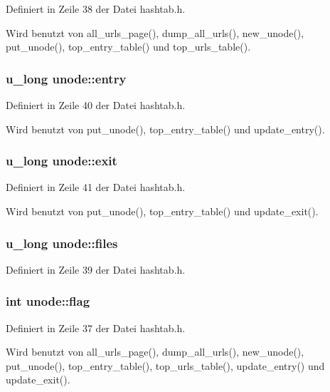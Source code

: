 Definiert in Zeile 38 der Datei hashtab.h.

Wird benutzt von all\_\-urls\_\-page(), dump\_\-all\_\-urls(), new\_\-unode(), put\_\-unode(), top\_\-entry\_\-table() und top\_\-urls\_\-table().
\subsubsection{\setlength{\rightskip}{0pt plus 5cm}u\_\-long {\bf unode::entry}}\label{structunode_8799c3c150906874e134a2cc3ccce10d}




Definiert in Zeile 40 der Datei hashtab.h.

Wird benutzt von put\_\-unode(), top\_\-entry\_\-table() und update\_\-entry().
\subsubsection{\setlength{\rightskip}{0pt plus 5cm}u\_\-long {\bf unode::exit}}\label{structunode_60177f74305a04d4aac550c6b24f8549}




Definiert in Zeile 41 der Datei hashtab.h.

Wird benutzt von put\_\-unode(), top\_\-entry\_\-table() und update\_\-exit().
\subsubsection{\setlength{\rightskip}{0pt plus 5cm}u\_\-long {\bf unode::files}}\label{structunode_e804f1505713967ff89aae41783c6be1}




Definiert in Zeile 39 der Datei hashtab.h.
\subsubsection{\setlength{\rightskip}{0pt plus 5cm}int {\bf unode::flag}}\label{structunode_172c31b32a93663cdde52fba42c0343d}




Definiert in Zeile 37 der Datei hashtab.h.

Wird benutzt von all\_\-urls\_\-page(), dump\_\-all\_\-urls(), new\_\-unode(), put\_\-unode(), top\_\-entry\_\-table(), top\_\-urls\_\-table(), update\_\-entry() und update\_\-exit().
